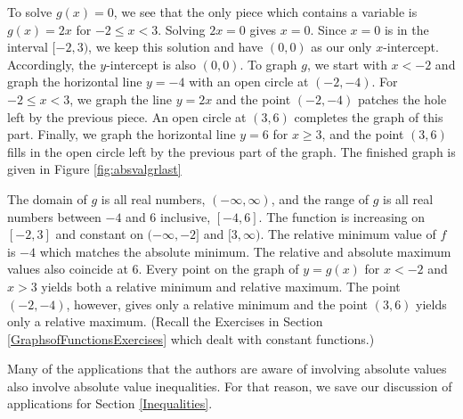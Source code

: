 {To solve $g(x)=0$, we see that the only piece which contains a variable is $g(x) = 2x$ for $-2 \leq x < 3$.  Solving $2x=0$ gives $x=0$.  Since $x=0$ is in the interval $[-2,3)$, we keep this solution and have $(0,0)$ as our only $x$-intercept.  Accordingly, the $y$-intercept is also $(0,0)$.  To graph $g$, we start with $x < -2$ and graph the horizontal line $y=-4$ with an open circle  at $(-2,-4)$. For $-2 \leq x < 3$, we graph the line $y=2x$ and the point $(-2,-4)$ patches the hole left by the previous piece.  An open circle at $(3,6)$ completes the graph of this part.  Finally, we graph the horizontal line $y=6$ for $x \geq 3$, and the point $(3,6)$ fills in the open circle left by the previous part of the graph.  The finished graph is given in Figure \ref{fig:absvalgrlast}


The domain of $g$ is all real numbers, $(-\infty, \infty)$, and the range of $g$ is all real numbers between $-4$ and $6$ inclusive, $[-4,6]$.  The function is increasing on $[-2,3]$ and constant on $(-\infty, -2]$ and $[3,\infty)$.  The relative minimum value of $f$ is $-4$ which matches the absolute minimum.  The relative and absolute maximum values also coincide at $6$.  Every point on the graph of $y=g(x)$ for $x<-2$ and $x> 3$ yields both a relative minimum and relative maximum.  The point $(-2,-4)$, however, gives only a relative minimum and the point $(3,6)$ yields only a relative maximum.  (Recall the Exercises in Section \ref{GraphsofFunctionsExercises} which dealt with constant functions.)
}

\medskip

Many of the applications that the authors are aware of involving absolute values also involve absolute value inequalities.  For that reason, we save our discussion of applications for Section \ref{Inequalities}.

